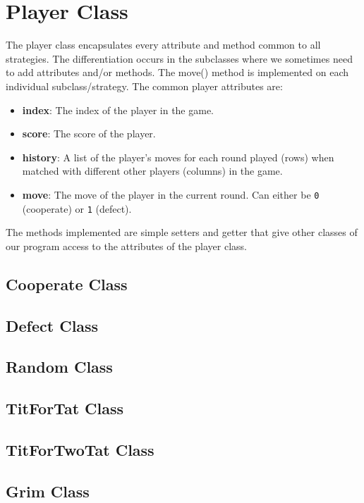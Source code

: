 \section{Player Class}
The player class encapsulates every attribute and method common to all strategies. The differentiation occurs in the subclasses where we sometimes need to add attributes and/or methods. The move() method is implemented on each individual subclass/strategy. The common player attributes are:
\begin{itemize}
    \item \textbf{index}: The index of the player in the game.
    \item \textbf{score}: The score of the player.
    \item \textbf{history}: A list of the player's moves for each round played (rows) when matched with different other players (columns) in the game.
    \item \textbf{move}: The move of the player in the current round. Can either be \texttt{0} (cooperate) or \texttt{1} (defect).
\end{itemize}
The methods implemented are simple setters and getter that give other classes of our program access to the attributes of the player class.


\subsection{Cooperate Class}

\subsection{Defect Class}

\subsection{Random Class}

\subsection{TitForTat Class}

\subsection{TitForTwoTat Class}

\subsection{Grim Class}


